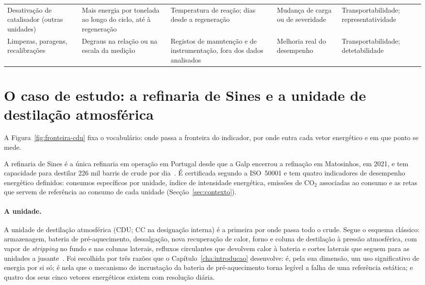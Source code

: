 {\begin{xltabular}{\textwidth}{@{}>{\raggedright\arraybackslash}p{2.3cm} >{\raggedright\arraybackslash}X >{\raggedright\arraybackslash}X >{\raggedright\arraybackslash}X >{\raggedright\arraybackslash}p{2.1cm}@{}}
    Desativação de catalisador (outras unidades) & Mais energia por tonelada ao longo do ciclo, até à regeneração & Temperatura de reação; dias desde a regeneração & Mudança de carga ou de severidade & Transportabilidade; representatividade \\
    Limpezas, paragens, recalibrações & Degraus na relação ou na escala da medição & Registos de manutenção e de instrumentação, fora dos dados analisados & Melhoria real do desempenho & Transportabilidade; detetabilidade \\
\end{xltabular}
}

\section{O caso de estudo: a refinaria de Sines e a unidade de destilação atmosférica}
\label{sec:caso-estudo}
A Figura~\ref{fig:fronteira-cdu} fixa o vocabulário: onde passa a fronteira do indicador, por onde entra cada vetor energético e em que ponto se mede.



A refinaria de Sines é a única refinaria em operação em Portugal desde que a
Galp encerrou a refinação em Matosinhos, em 2021, e tem capacidade para
destilar 226 mil barris de crude por dia~\cite{Galp2026Industrial}. É certificada
segundo a ISO~50001 e tem quatro indicadores de desempenho energético
definidos: consumos específicos por unidade, índice de intensidade
energética, emissões de CO$_2$ associadas ao consumo e as retas que servem
de referência ao consumo de cada unidade (Secção~\ref{sec:contexto}).

\paragraph{A unidade.} A unidade de destilação atmosférica (CDU; CC na
designação interna) é a primeira por onde passa todo o crude. Segue o
esquema clássico: armazenagem, bateria de pré-aquecimento, dessalgação,
nova recuperação de calor, forno e coluna de destilação à pressão
atmosférica, com vapor de \emph{stripping} no fundo e nas colunas laterais,
refluxos circulantes que devolvem calor à bateria e cortes laterais que
seguem para as unidades a jusante~\cite{Gary2007}. Foi escolhida por três
razões que o Capítulo~\ref{cha:introducao} desenvolve: é, pela sua dimensão,
um uso significativo de energia por si só; é nela que o mecanismo de
incrustação da bateria de pré-aquecimento torna legível a falha de uma
referência estática; e quatro dos seus cinco vetores energéticos existem
com resolução diária.

